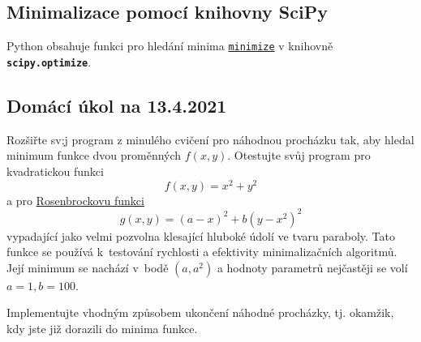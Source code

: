 \documentclass[a4paper,11pt,twoside]{article}
\def\code#1{\textnormal{\texttt{#1}}}
\def\file#1{\textnormal{\textbf{\texttt{#1}}}}
\theoremstyle{red}
\theoremstyle{green}
\begin{document}
\subsection{Minimalizace pomocí knihovny SciPy}
    Python obsahuje funkci pro hledání minima \code{\href{https://docs.scipy.org/doc/scipy/reference/generated/scipy.optimize.minimize.html}{minimize}} v knihovně \file{scipy.optimize}.
    
\newpage
{\color{red}\subsection{Domácí úkol na 13.4.2021}}
\begin{task}
    Rozšiřte sv;j program z minulého cvičení pro náhodnou procházku tak, aby hledal minimum funkce dvou proměnných $f(x,y)$.
    Otestujte svůj program pro kvadratickou funkci
    \begin{equation}\label{eq:Minimumf}
        f(x,y)=x^{2}+y^{2}
    \end{equation}
    a pro \href{https://en.wikipedia.org/wiki/Rosenbrock_function}{Rosenbrockovu funkci}
    \begin{equation}\label{eq:Minimumg}
        g(x,y)=(a-x)^{2}+b\left(y-x^{2}\right)^{2}        
    \end{equation}
    vypadající jako velmi pozvolna klesající hluboké údolí ve tvaru paraboly.
    Tato funkce se používá k~testování rychlosti a efektivity minimalizačních algoritmů.
    Její minimum se nachází v~bodě $\left(a,a^{2}\right)$ a hodnoty parametrů nejčastěji se volí $a=1,b=100$.   
    
    Implementujte vhodným způsobem ukončení náhodné procházky, tj. okamžik, kdy jste již dorazili do minima funkce.
\end{task}
\end{document}
